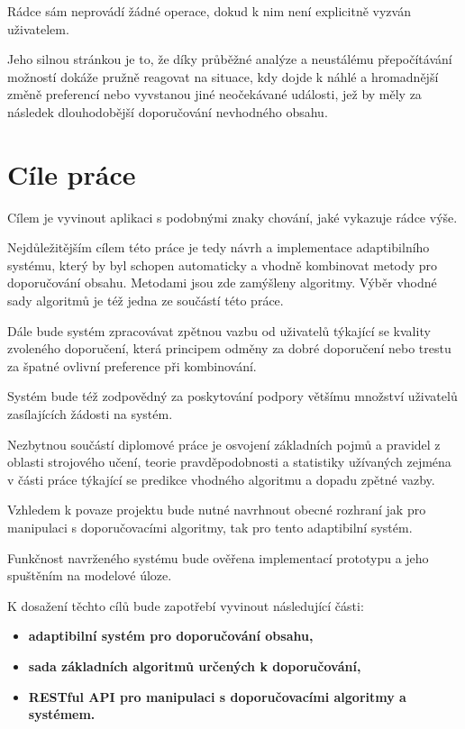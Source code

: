\documentclass[thesis=M,czech]{FITthesis}[2014/05/07]
\begin{document}
\begin{introduction}
	Rádce sám neprovádí žádné operace, dokud k nim není explicitně vyzván uživatelem.
	
	Jeho silnou stránkou je to, že díky průběžné analýze a neustálému přepočítávání možností dokáže pružně reagovat na situace, kdy dojde k náhlé a hromadnější změně preferencí nebo vyvstanou jiné neočekávané události, jež by měly za následek dlouhodobější doporučování nevhodného obsahu.
	
\section{Cíle práce}
\label{sec:objectives}
	Cílem je vyvinout aplikaci s podobnými znaky chování, jaké vykazuje rádce výše.

	Nejdůležitějším cílem této práce je tedy návrh a implementace adaptibilního systému, který by byl schopen automaticky a vhodně kombinovat metody pro doporučování obsahu. Metodami jsou zde zamýšleny algoritmy. Výběr vhodné sady algoritmů je též jedna ze součástí této práce.
	
	Dále bude systém zpracovávat zpětnou vazbu od uživatelů týkající se kvality zvoleného doporučení, která principem odměny za dobré doporučení nebo trestu za špatné ovlivní preference při kombinování.
	
	Systém bude též zodpovědný za poskytování podpory většímu množství uživatelů zasílajících žádosti na systém.
	
	Nezbytnou součástí diplomové práce je osvojení základních pojmů a pravidel z oblasti strojového učení, teorie pravděpodobnosti a statistiky užívaných zejména v části práce týkající se predikce vhodného algoritmu a dopadu zpětné vazby. 
	
	Vzhledem k povaze projektu bude nutné navrhnout obecné rozhraní jak pro manipulaci s doporučovacími algoritmy, tak pro tento adaptibilní systém.
	
	Funkčnost navrženého systému bude ověřena implementací prototypu a jeho spuštěním na modelové úloze.
	
	K dosažení těchto cílů bude zapotřebí vyvinout následující části:

\begin{itemize}
  \item \textbf{adaptibilní systém pro doporučování obsahu,}
  \item \textbf{sada základních algoritmů určených k doporučování,}
  \item \textbf{RESTful API pro manipulaci s doporučovacími algoritmy a systémem.}
\end{itemize}	


\end{introduction}
\end{document}
